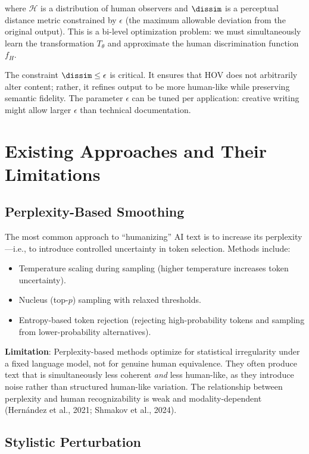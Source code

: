 \documentclass[12pt,oneside]{article}
\begin{document}
where $\mathcal{H}$ is a distribution of human observers and $\dissim$ is a perceptual distance metric constrained by $\epsilon$ (the maximum allowable deviation from the original output). This is a bi-level optimization problem: we must simultaneously learn the transformation $T_\theta$ and approximate the human discrimination function $f_H$.

The constraint $\dissim \leq \epsilon$ is critical. It ensures that HOV does not arbitrarily alter content; rather, it refines output to be more human-like while preserving semantic fidelity. The parameter $\epsilon$ can be tuned per application: creative writing might allow larger $\epsilon$ than technical documentation.

\section{Existing Approaches and Their Limitations}

\subsection{Perplexity-Based Smoothing}

The most common approach to ``humanizing'' AI text is to increase its perplexity---i.e., to introduce controlled uncertainty in token selection. Methods include:
\begin{itemize}[noitemsep]
    \item Temperature scaling during sampling (higher temperature increases token uncertainty).
    \item Nucleus (top-$p$) sampling with relaxed thresholds.
    \item Entropy-based token rejection (rejecting high-probability tokens and sampling from lower-probability alternatives).
\end{itemize}

\textbf{Limitation}: Perplexity-based methods optimize for statistical irregularity under a fixed language model, not for genuine human equivalence. They often produce text that is simultaneously less coherent \textit{and} less human-like, as they introduce noise rather than structured human-like variation. The relationship between perplexity and human recognizability is weak and modality-dependent (Hernández et al., 2021; Shmakov et al., 2024).

\subsection{Stylistic Perturbation}
\end{document}
